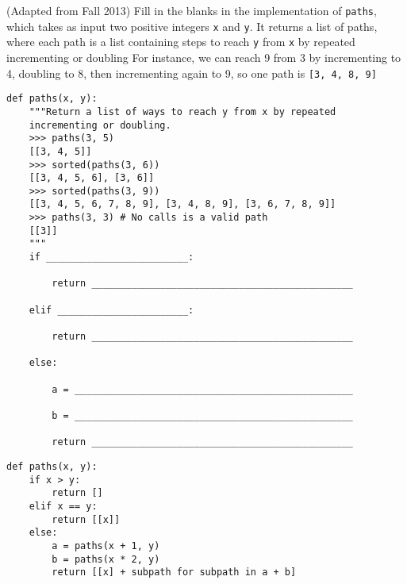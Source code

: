 \question (Adapted from Fall 2013) Fill in the blanks in the implementation of
\texttt{paths}, which takes as input two positive integers \texttt{x} and
\texttt{y}. It returns a list of paths, where each path is a list containing
steps to reach \texttt{y} from \texttt{x} by repeated incrementing or doubling
For instance, we can reach 9 from 3 by incrementing to 4, doubling to 8, 
then incrementing again to 9, so one path is \texttt{[3, 4, 8, 9]}

\medskip

\begin{lstlisting}
def paths(x, y):
    """Return a list of ways to reach y from x by repeated
    incrementing or doubling.
    >>> paths(3, 5) 
    [[3, 4, 5]]
    >>> sorted(paths(3, 6))
    [[3, 4, 5, 6], [3, 6]]
    >>> sorted(paths(3, 9))
    [[3, 4, 5, 6, 7, 8, 9], [3, 4, 8, 9], [3, 6, 7, 8, 9]]
    >>> paths(3, 3) # No calls is a valid path
    [[3]]
    """
    if _________________________:

        return ______________________________________________

    elif _______________________:

        return ______________________________________________

    else:

        a = _________________________________________________

        b = _________________________________________________

        return ______________________________________________
\end{lstlisting}
\begin{solution}
\begin{lstlisting}
def paths(x, y):
    if x > y:
        return []
    elif x == y:
        return [[x]]
    else:
        a = paths(x + 1, y)
        b = paths(x * 2, y)
        return [[x] + subpath for subpath in a + b]
\end{lstlisting}
\end{solution}

\clearpage